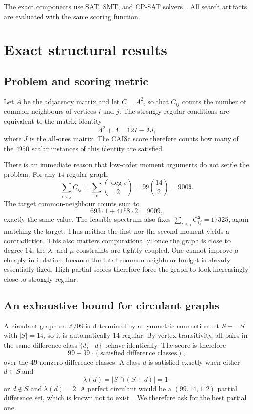 \documentclass{article}
\begin{document}
The exact components use SAT, SMT, and CP-SAT
solvers~\cite{biere2021handbook,demoura2008z3,perron2024ortools}. All search
artifacts are evaluated with the same scoring function.

\section{Exact structural results}

\subsection{Problem and scoring metric}
Let $A$ be the adjacency matrix and let $C=A^2$, so that $C_{ij}$ counts the
number of common neighbours of vertices $i$ and $j$. The strongly regular
conditions are equivalent to the matrix identity
\[
A^2+A-12I=2J,
\]
where $J$ is the all-ones matrix. The CAISc score therefore counts how many of
the $4950$ scalar instances of this identity are satisfied.

There is an immediate reason that low-order moment arguments do not settle the
problem. For any $14$-regular graph,
\[
\sum_{i<j}C_{ij}
=\sum_v\binom{\deg v}{2}
=99\binom{14}{2}
=9009.
\]
The target common-neighbour counts sum to
\[
693\cdot1+4158\cdot2=9009,
\]
exactly the same value. The feasible spectrum also fixes
$\sum_{i<j}C_{ij}^2=17325$, again matching the target. Thus neither the first
nor the second moment yields a contradiction. This also matters
computationally: once the graph is close to degree $14$, the $\lambda$- and
$\mu$-constraints are tightly coupled. One cannot improve $\mu$ cheaply in
isolation, because the total common-neighbour budget is already essentially
fixed. High partial scores therefore force the graph to look increasingly
close to strongly regular.

\subsection{An exhaustive bound for circulant graphs}
A circulant graph on $\mathbb{Z}/99$ is determined by a symmetric connection
set $S=-S$ with $|S|=14$, so it is automatically $14$-regular. By
vertex-transitivity, all pairs in the same difference class $\{d,-d\}$ behave
identically. The score is therefore
\[
99+99\cdot(\text{satisfied difference classes}),
\]
over the $49$ nonzero difference classes. A class $d$ is satisfied exactly
when either $d\in S$ and
\[
\lambda(d)=|S\cap(S+d)|=1,
\]
or $d\notin S$ and $\lambda(d)=2$. A perfect circulant would be a
$(99,14,1,2)$ partial difference set, which is known not to
exist~\cite{ma1994}. We therefore ask for the best partial one.
\end{document}
